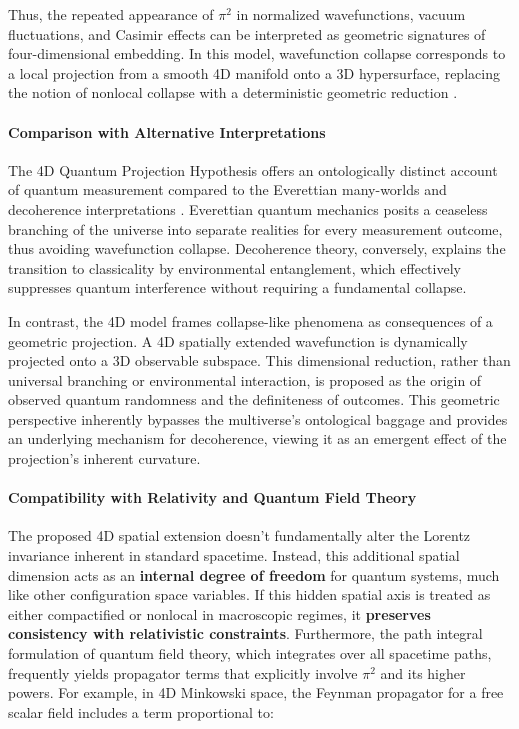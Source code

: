 \documentclass[12pt,a4paper]{article}
\begin{document}
Thus, the repeated appearance of \(\pi^2\) in normalized wavefunctions, vacuum fluctuations, and Casimir effects can be interpreted as geometric signatures of four-dimensional embedding. In this model, wavefunction collapse corresponds to a local projection from a smooth 4D manifold onto a 3D hypersurface, replacing the notion of nonlocal collapse with a deterministic geometric reduction \cite{zurek_decoherence_2003,tegmark_importance_2000}.

\paragraph{Comparison with Alternative Interpretations}
The 4D Quantum Projection Hypothesis offers an ontologically distinct account of quantum measurement compared to the Everettian many-worlds \cite{everett_many_1957} and decoherence interpretations \cite{zurek_decoherence_2003}. Everettian quantum mechanics posits a ceaseless branching of the universe into separate realities for every measurement outcome, thus avoiding wavefunction collapse. Decoherence theory, conversely, explains the transition to classicality by environmental entanglement, which effectively suppresses quantum interference without requiring a fundamental collapse.

In contrast, the 4D model frames collapse-like phenomena as consequences of a geometric projection. A 4D spatially extended wavefunction is dynamically projected onto a 3D observable subspace. This dimensional reduction, rather than universal branching or environmental interaction, is proposed as the origin of observed quantum randomness and the definiteness of outcomes. This geometric perspective inherently bypasses the multiverse's ontological baggage and provides an underlying mechanism for decoherence, viewing it as an emergent effect of the projection's inherent curvature.

\paragraph{Compatibility with Relativity and Quantum Field Theory}
The proposed 4D spatial extension doesn't fundamentally alter the Lorentz invariance inherent in standard spacetime. Instead, this additional spatial dimension acts as an \textbf{internal degree of freedom} for quantum systems, much like other configuration space variables. If this hidden spatial axis is treated as either compactified or nonlocal in macroscopic regimes, it \textbf{preserves consistency with relativistic constraints}. Furthermore, the path integral formulation of quantum field theory, which integrates over all spacetime paths, frequently yields propagator terms that explicitly involve $\pi^2$ and its higher powers. For example, in 4D Minkowski space, the Feynman propagator for a free scalar field includes a term proportional to:
\end{document}
